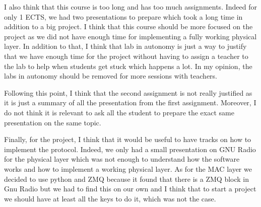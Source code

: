 I also think that this course is too long and has too much assignments. Indeed for only 1 ECTS, we had two presentations to prepare which took a long time in addition to a big project. I think that this course should be more focused on the project as we did not have enough time for implementing a fully working physical layer. In addition to that, I think that lab in autonomy is just a way to justify that we have enough time for the project without having to assign a teacher to the lab to help when students get stuck which happens a lot. In my opinion, the labs in autonomy should be removed for more sessions with teachers.
\par
Following this point, I think that the second assignment is not really justified as it is just a summary of all the presentation from the first assignment. Moreover, I do not think it is relevant to ask all the student to prepare the exact same presentation on the same topic.
\\\par

Finally, for the project, I think that it would be useful to have tracks on how to implement the protocol. Indeed, we only had a small presentation on GNU Radio for the physical layer which was not enough to understand how the software works and how to implement a working physical layer. As for the MAC layer we decided to use python and ZMQ because it found that there is a ZMQ block in Gnu Radio but we had to find this on our own and I think that to start a project we should have at least all the keys to do it, which was not the case.


